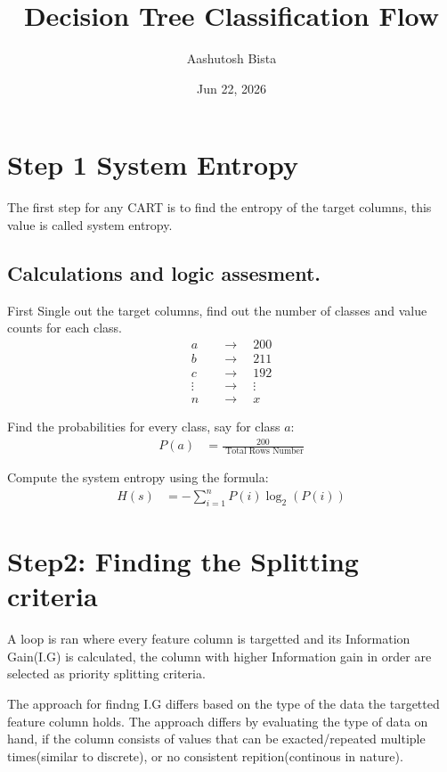 \documentclass[12pt,letterpaper]{article}
\title{Decision Tree Classification Flow}
\author{Aashutosh Bista}
\date{Jun 22, 2026}
\begin{document}
\maketitle

\section{Step 1 System Entropy}
The first step for any CART is to find the entropy of the target columns, this value is called system entropy.

\subsection{Calculations and logic assesment.}
First Single out the target columns, find out the number of classes and value counts for each class.
\begin{align*}
    a \quad &\longrightarrow \quad 200 \\
    b \quad &\longrightarrow \quad 211 \\
    c \quad &\longrightarrow \quad 192 \\
    \vdots \quad &\longrightarrow \quad \vdots \\
    n \quad &\longrightarrow \quad x
\end{align*} 

Find the probabilities for every class, say for class $a$:
\begin{align*}
    P(a) &=\frac{200}{\text{ Total Rows Number}}
\end{align*} 

Compute the system entropy using the formula: 
\begin{align*}
    H(s) &= -\sum_{i=1}^{n} P(i) \log_2(P(i))
\end{align*}    

\section{Step2: Finding the Splitting criteria}
A loop is ran where every feature column is targetted and its Information Gain(I.G) is calculated, the column with higher Information gain in order are selected as priority splitting criteria.

The approach for findng I.G differs based on the type of the data the targetted feature column holds. The approach differs by evaluating the type of data on hand, if the column consists of values that can be exacted/repeated multiple times(similar to discrete), or no consistent repition(continous in nature).
\end{document}
